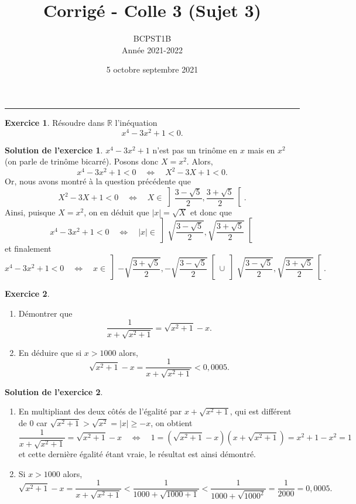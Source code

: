 \documentclass[a4paper, 11pt,openany]{article}%
\title{Corrigé - Colle 3 (Sujet 3)}
\author{BCPST1B\\
Année 2021-2022}
\date{5 octobre septembre 2021}
\theoremstyle{plain}
\theoremstyle{definition}
\newtheorem{exo}{Exercice}
\newtheorem{sol}{Solution de l'exercice}
\theoremstyle{remark}
\newcommand{\R}{\mathbb{R}}
\begin{document}
   \maketitle
      \rule{\linewidth}{0.5mm}


\begin{exo}
Résoudre dans $\R$ l'inéquation
\[ x^4 - 3x^2 +1 < 0.\]
\end{exo}

\begin{sol}
$x^4 -3x^2 +1$ n'est pas un trinôme en $x$ mais en $x^2$ (on parle de trinôme bicarré). Posons donc $X = x^2$. Alors,
\[ x^4 -3x^2 +1 < 0 \quad \Leftrightarrow \quad X^2 - 3X +1 < 0.\]
Or, nous avons montré à la question précédente que
\[ X^2 - 3X +1 < 0 \quad \Leftrightarrow \quad  X \in \left] \frac{3 - \sqrt{5}}{2}, \frac{3 + \sqrt{5}}{2} \right[.\]
Ainsi, puisque $X = x^2$, on en déduit que $|x| = \sqrt{X}$ et donc que
\[ x^4 -3x^2 +1 < 0 \quad \Leftrightarrow \quad  |x| \in \left] \sqrt{\frac{3 - \sqrt{5}}{2}}, \sqrt{\frac{3 + \sqrt{5}}{2}} \right[\]
et finalement
\[  x^4 -3x^2 +1 < 0\quad \Leftrightarrow \quad  x \in \left] - \sqrt{\frac{3 + \sqrt{5}}{2}},- \sqrt{\frac{3 - \sqrt{5}}{2}} \right[ \cup \left] \sqrt{\frac{3 - \sqrt{5}}{2}}, \sqrt{\frac{3 + \sqrt{5}}{2}} \right[ .\]
\end{sol}

\begin{exo}
\begin{enumerate}
\item Démontrer que
\[ \frac{1}{x + \sqrt{x^2 +1 }} = \sqrt{x^2 +1} - x .\]
\item En déduire que si $x > 1000$ alors,
\[ \sqrt{x^2+1}-x = \frac{1}{x + \sqrt{x^2 +1 }} <  0,0005.\] 
\end{enumerate}
\end{exo}

\begin{sol}
\begin{enumerate}
\item En multipliant des deux côtés de l'égalité par $x + \sqrt{x^2 +1}$, qui est différent de $0$ car $\sqrt{x^2 +1} > \sqrt{x^2} = |x| \geqslant -x$, on obtient
\[\frac{1}{x + \sqrt{x^2 +1 }} = \sqrt{x^2 +1} - x \quad \Leftrightarrow \quad 1 = (\sqrt{x^2+1} - x) (x + \sqrt{x^2 +1}) = x^2+1 - x^2 = 1\]
et cette dernière égalité étant vraie, le résultat est ainsi démontré.
\item Si $x > 1000$ alors,
\[ \sqrt{x^2+1}-x = \frac{1}{x + \sqrt{x^2 +1 }} < \frac{1}{1000 + \sqrt{1000 +1}} < \frac{1}{1000 + \sqrt{1000^2}} = \frac{1}{2000} = 0,0005.\] 
\end{enumerate}
\end{sol}
\end{document}
